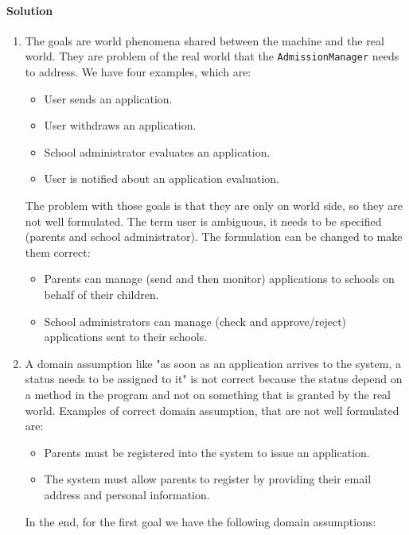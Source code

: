 \paragraph*{Solution}
\begin{enumerate}
    \item The goals are world phenomena shared between the machine and the real world. They are problem of the real world that the \texttt{AdmissionManager} needs to address. We have 
        four examples, which are: 
        \begin{itemize}
            \item User sends an application.
            \item User withdraws an application.
            \item School administrator evaluates an application.
            \item User is notified about an application evaluation. 
        \end{itemize}
        The problem with those goals is that they are only on world side, so they are not well formulated. The term user is ambiguous, it needs to be specified (parents and school 
        administrator). The formulation can be changed to make them correct: 
        \begin{itemize}
            \item Parents can manage (send and then monitor) applications to schools on behalf of their children.
            \item School administrators can manage (check and approve/reject) applications sent to their schools.
        \end{itemize}
    \item A domain assumption like "as soon as an application arrives to the system, a status needs to be assigned to it" is not correct because the status depend on a method in 
        the program and not on something that is granted by the real world. Examples of correct domain assumption, that are not well formulated are: 
        \begin{itemize}
            \item Parents must be registered into the system to issue an application. 
            \item The system must allow parents to register by providing their email address and personal information.  
        \end{itemize}
        In the end, for the first goal we have the following domain assumptions: 
        \begin{itemize}

\end{itemize}
\end{enumerate}
